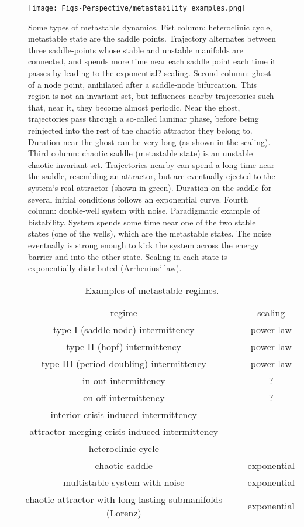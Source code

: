 \documentclass[preprint,superscriptaddress,showpacs,amsmath,amssymb,aps,pre,floatfix]{revtex4-1}
\theoremstyle{definition}
\begin{document}
\begin{figure}
    \centering
    \texttt{[image: Figs-Perspective/metastability\_examples.png]}
    \caption{Some types of metastable dynamics. Fist column: heteroclinic cycle, metastable state are the saddle points. Trajectory alternates between three saddle-points whose stable and unstable manifolds are connected, and spends more time near each saddle point each time it passes by leading to the exponential? scaling. Second column: ghost of a node point, anihilated after a saddle-node bifurcation. This region is not an invariant set, but influences nearby trajectories such that, near it, they become almost periodic. Near the ghost, trajectories pass through a so-called laminar phase, before being reinjected into the rest of the chaotic attractor they belong to. Duration near the ghost can be very long (as shown in the scaling). Third column: chaotic saddle (metastable state) is an unstable chaotic invariant set. Trajectories nearby can spend a long time near the saddle, resembling an attractor, but are eventually ejected to the system`s real attractor (shown in green). Duration on the saddle for several initial conditions follows an exponential curve. Fourth column: double-well system with noise. Paradigmatic example of bistability. System spends some time near one of the two stable states (one of the wells), which are the metastable states. The noise eventually is strong enough to kick the system across the energy barrier and into the other state. Scaling in each state is exponentially distributed (Arrhenius` law). }
    \label{fig:metastability-examples}
\end{figure}

\begin{table}[]
    \centering
    \begin{tabular}{|c|c|}
    \hline 
    regime & scaling \\
        type I (saddle-node) intermittency & power-law \\
        type II (hopf) intermittency & power-law \\
        type III (period doubling) intermittency & power-law \\
        in-out intermittency & ? \\
        on-off intermittency & ? \\
        interior-crisis-induced intermittency &  \\
        attractor-merging-crisis-induced intermittency &  \\
        heteroclinic cycle &  \\
        chaotic saddle &  exponential \\
        multistable system with noise & exponential  \\
        chaotic attractor with long-lasting submanifolds (Lorenz) & exponential  \\
        \hline
    \end{tabular}
    \caption{Examples of metastable regimes.}
    \label{tab:metastableregimes}
\end{table}
\end{document}
